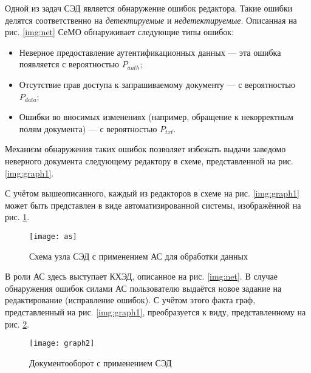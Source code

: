 Одной из задач СЭД является обнаружение ошибок редактора. Такие ошибки делятся соответственно на \textit{детектируемые} и \textit{недетектируемые}.
Описанная на рис. \ref{img:net} СеМО обнаруживает следующие типы ошибок:
\begin{itemize}
  \item Неверное предоставление аутентификационных данных --- эта ошибка появляется с вероятностью $P_{auth}$;
  \item Отсутствие прав доступа к запрашиваемому документу --- с вероятностью $P_{data}$;
  \item Ошибки во вносимых изменениях (например, обращение к некорректным полям документа) --- с вероятностью $P_{txt}$.
\end{itemize}

Механизм обнаружения таких ошибок позволяет избежать выдачи заведомо неверного документа следующему редактору в схеме, представленной на рис. \ref{img:graph1}.

\vspace{\baselineskip}
С учётом вышеописанного, каждый из редакторов в схеме на рис. \ref{img:graph1} может быть представлен в виде автоматизированной системы, изображённой на рис. \ref{img:as}.

\begin{figure}[h]
  \centering
  \texttt{[image: as]}
  \caption{Схема узла СЭД с применением АС для обработки данных}
  \label{img:as}
\end{figure}

В роли АС здесь выступает КХЭД, описанное на рис. \ref{img:net}. В случае обнаружения ошибок силами АС пользователю выдаётся новое задание на редактирование (исправление ошибок). С учётом этого факта граф, представленный на рис. \ref{img:graph1}, преобразуется к виду, представленному на рис. \ref{img:graph2}.

\begin{figure}[h!]
  \centering
  \texttt{[image: graph2]}
  \caption{Документооборот с применением СЭД}
  \label{img:graph2}
\end{figure}
\FloatBarrier